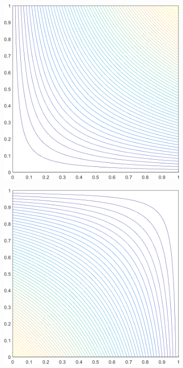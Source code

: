 \begin{figure}
\begin{subfigure}[b]{0.39\textwidth}
		\includegraphics[width=\textwidth]{figures/sec_BF/square_WACHSPRESS1_contour_b3.png}
		\caption{}
	\end{subfigure}
	\vfill
	\begin{subfigure}[b]{0.39\textwidth}
		\centering
		\includegraphics[width=\textwidth]{figures/sec_BF/square_WACHSPRESS1_contour_b1.png}

\end{subfigure}
\end{figure}
